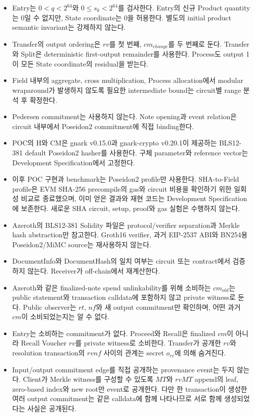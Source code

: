 \documentclass[11pt,a4paper]{extarticle}
\newcommand{\CM}{\mathrm{CM}}
\newcommand{\Hash}{\mathrm{H}}
\begin{document}
\begin{itemize}
        nano scale $10^9$ fixed-point 값으로 encode한다.
  \item Entry는 $0<q<2^{64}$와
        $0\leq s_k<2^{64}$를 검사한다. Entry의 신규 Product quantity는 0일 수 없지만,
        State coordinate는 0을 허용한다. 별도의 initial product semantic invariant는
        강제하지 않는다.
  \item Transfer의 output ordering은 $rv$를 첫 번째, $cm_{change}$를 두 번째로 둔다.
        Transfer와 Split은 deterministic first-output remainder를 사용한다.
        Process도 output 1이 모든 State coordinate의 residual을 받는다.
  \item Field 내부의 aggregate, cross multiplication, Process allocation에서
        modular wraparound가 발생하지 않도록 필요한 intermediate bound는
        circuit별 range 분석 후 확정한다.
  \item Pedersen commitment는 사용하지 않는다. Note opening과 event relation은
        circuit 내부에서 Poseidon2 commitment에 직접 binding한다.
  \item POC의 $\Hash$와 $\CM$은 gnark v0.15.0과 gnark-crypto v0.20.1이 제공하는
        BLS12-381 default Poseidon2 hasher를 사용한다. 구체 parameter와 reference
        vector는 Development Specification에서 고정한다.
  \item 이후 POC 구현과 benchmark는 Poseidon2 profile만 사용한다. SHA-to-Field
        profile은 EVM SHA-256 precompile의 gas와 circuit 비용을 확인하기 위한 일회성
        비교로 종료했으며, 이미 얻은 결과와 재현 코드는 Development Specification에
        보존한다. 새로운 SHA circuit, setup, proof와 gas 실험은 수행하지 않는다.
  \item Azeroth의 BLS12-381 Solidity 파일은 protocol/verifier separation과
        Merkle hash abstraction만 참고한다. Groth16 verifier, 과거 EIP-2537 ABI와
        BN254용 Poseidon2/MiMC source는 재사용하지 않는다.
  \item DocumentInfo와 DocumentHash의 일치 여부는 circuit 또는 contract에서
        검증하지 않는다. Receiver가 off-chain에서 재계산한다.
  \item Azeroth와 같은 finalized-note spend unlinkability를 위해 소비하는
        $cm_{old}$는 public statement와 transaction calldata에 포함하지 않고
        private witness로 둔다. Public observer는 $rt$, $nf$와 새 output commitment만
        확인하며, 어떤 과거 $cm$이 소비되었는지는 알 수 없다.
  \item Entry는 소비하는 commitment가 없다. Proceed와 Recall은 finalized $cm$이 아니라
        Recall Voucher $rv$를 private witness로 소비한다. Transfer가 공개한 $rv$와
        resolution transaction의 $rvnf$ 사이의 관계는 secret $o_{rv}$에 의해 숨겨진다.
  \item Input/output commitment edge를 직접 공개하는 provenance event는 두지 않는다.
        Client가 Merkle witness를 구성할 수 있도록 $MT$와 $rvMT$ append의 leaf,
        zero-based index와 new root만 event로 공개한다. 다만 한 transaction이 생성한
        여러 output commitment는 같은 calldata에 함께 나타나므로 서로 함께 생성되었다는
        사실은 공개된다.
\end{itemize}
\end{document}
